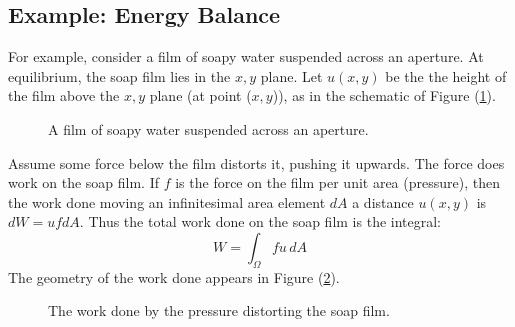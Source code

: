 \documentclass[12pt, a4paper, twoside, openright]{book}
\begin{document}
\subsection{Example: Energy Balance}

For example, consider a film of soapy water suspended across an aperture.  At equilibrium, the soap film lies in the $x,y$ plane.  Let $u(x,y)$ be the the height of the film above the $x,y$ plane (at point ($x,y$)), as in the schematic of Figure (\ref{soapy}).

\begin{figure}[ht]
\centering
{}
\caption{A film of soapy water suspended across an aperture.}\label{soapy}
\end{figure}

Assume some force below the film distorts it, pushing it upwards.  The force does work on the soap film. If $f$ is the force on the film per unit area (pressure), then the work done moving an infinitesimal area element $dA$ a distance $u(x,y)$ is $dW = u f dA$. Thus the total work done on the soap film is the integral: 
\begin{equation}
W = \int_{\Omega} f u \,dA
\end{equation} 
The geometry of the work done appears in Figure (\ref{work}).
\begin{figure}[ht]
\centering
{}
\caption{The work done by the pressure distorting the soap film.}\label{work}
\end{figure}
\end{document}
